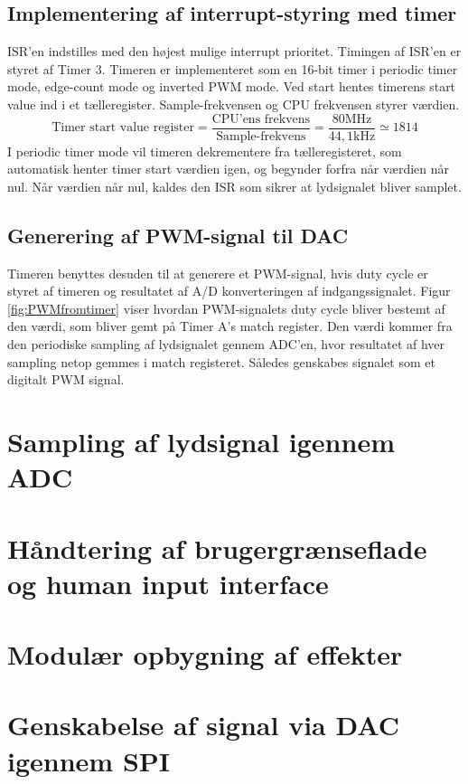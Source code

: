 \subsection{Implementering af interrupt-styring med timer}
ISR'en indstilles med den højest mulige interrupt prioritet. 
Timingen af ISR'en er styret af Timer 3. 
Timeren er implementeret som en 16-bit timer i periodic timer mode, edge-count mode og inverted PWM mode.
Ved start hentes timerens start value ind i et tælleregister. 
Sample-frekvensen og CPU frekvensen styrer værdien. 
\begin{equation}
	\text{Timer start value register} = \frac{\text{CPU'ens frekvens}}{\text{Sample-frekvens}} = \frac{80\text{MHz}}{44,1\text{kHz}} \simeq 1814
\end{equation}
I periodic timer mode vil timeren dekrementere fra tælleregisteret, som automatisk henter timer start værdien igen, og begynder forfra når værdien når nul. 
Når værdien når nul, kaldes den ISR som sikrer at lydsignalet bliver samplet. \newline

\subsection{Generering af PWM-signal til DAC}
Timeren benyttes desuden til at generere et PWM-signal, hvis duty cycle er styret af timeren og resultatet af A/D konverteringen af indgangssignalet. 
Figur \ref{fig:PWMfromtimer} viser hvordan PWM-signalets duty cycle bliver bestemt af den værdi, som bliver gemt på Timer A's match register. 
Den værdi kommer fra den periodiske sampling af lydsignalet gennem ADC'en, hvor resultatet af hver sampling netop gemmes i match registeret. 
Således genskabes signalet som et digitalt PWM signal. 


\section{Sampling af lydsignal igennem ADC}

\section{Håndtering af brugergrænseflade og human input interface}

\section{Modulær opbygning af effekter}

\section{Genskabelse af signal via DAC igennem SPI}

